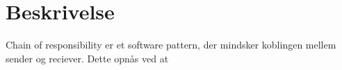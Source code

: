 \chapter{Beskrivelse}
Chain of responsibility er et software pattern, der mindsker koblingen mellem sender og reciever. Dette opnås ved at 
